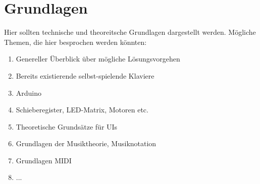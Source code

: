 \chapter{Grundlagen}

\nocite{*}

Hier sollten technische und theoreitsche Grundlagen dargestellt werden. Mögliche Themen, die hier besprochen werden könnten:

\begin{enumerate}
	\item Genereller Überblick über mögliche Lösungsvorgehen
	\item Bereits existierende selbst-spielende Klaviere
	\item Arduino
	\item Schieberegister, LED-Matrix, Motoren etc.
	\item Theoretische Grundsätze für UIs
	\item Grundlagen der Musiktheorie, Musiknotation
	\item Grundlagen MIDI
	\item ...
\end{enumerate}